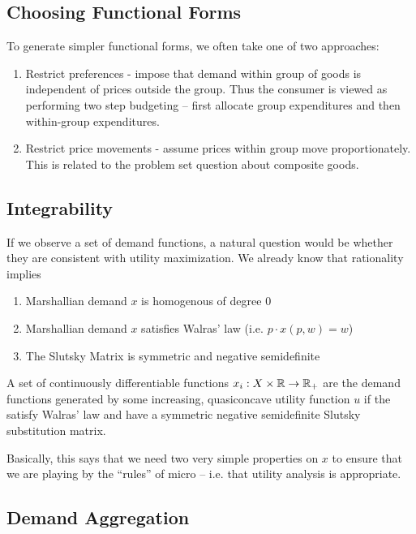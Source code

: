 \subsection{Choosing Functional Forms}
\label{sec:choos-funct-forms}


To generate simpler functional forms, we often take one of two
approaches:

\begin{enumerate}
\item Restrict preferences - impose that demand within group of goods
  is independent of prices outside the group. Thus the consumer is
  viewed as performing two step budgeting -- first allocate group
  expenditures and then within-group expenditures.
\item Restrict price movements - assume prices within group move
  proportionately. This is related to the problem set question about
  composite goods.
\end{enumerate}


\subsection{Integrability}
\label{sec:integrability}

If we observe a set of demand functions, a natural question would be
whether they are consistent with utility maximization. We already know
that rationality implies
\begin{enumerate}
\item Marshallian demand $x$ is homogenous of degree $0$
\item Marshallian demand $x$ satisfies Walras' law (i.e. $p \cdot
  x(p,w) = w$)
\item The Slutsky Matrix is symmetric and negative semidefinite
\end{enumerate}

\begin{prop}
  A set of continuously differentiable functions $x_i : X \times {\mathbb R}
  \to {\mathbb R}_+$ are the demand functions generated by some increasing,
  quasiconcave utility function $u$ if the satisfy Walras' law and
  have a symmetric negative semidefinite Slutsky substitution matrix.
\end{prop}

Basically, this says that we need two very simple properties on $x$ to
ensure that we are playing by the ``rules'' of micro -- i.e. that
utility analysis is appropriate.


\subsection{Demand Aggregation}
\label{sec:demand-aggregation}


